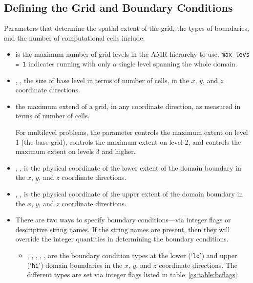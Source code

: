 \subsection{Defining the Grid and Boundary Conditions}

Parameters that determine the spatial extent of the grid, 
the types of boundaries, and the number of computational cells include:
\begin{itemize}

\item {} is the maximum number of grid levels in the AMR
  hierarchy to use.  {\tt max\_levs = 1} indicates running with only a
  single level spanning the whole domain.

\item {}, ,  the size of
  base level in terms of number of cells, in the $x$, $y$, and $z$
  coordinate directions.

\item {} the maximum extend of a grid, in any
  coordinate direction, as measured in terms of number of cells.

  For multilevel problems, the parameter 
  controls the maximum extent on level 1 (the base
  grid),  controls the maximum extent on
  level 2, and  controls the maximum extent on
  levels 3 and higher.

\item {}, ,  is
  the physical coordinate of the lower extent of the domain boundary
  in the $x$, $y$, and $z$ coordinate directions.

\item {}, ,  is
  the physical coordinate of the upper extent of the domain boundary
  in the $x$, $y$, and $z$ coordinate directions.

\item There are two ways to specify boundary conditions---via integer flags
      or descriptive string names.  If the string names are present,
      then they will override the integer quantities in determining
      the boundary conditions.

   \begin{itemize}

   \item {}, , , , ,  are the
      boundary condition types at the lower (`{\tt lo}') and upper
      (`{\tt hi}') domain boundaries in the $x$, $y$, and $z$
      coordinate directions.  The different types are set via integer
      flags listed in table~\ref{gs:table:bcflags}.


\end{itemize}
\end{itemize}
